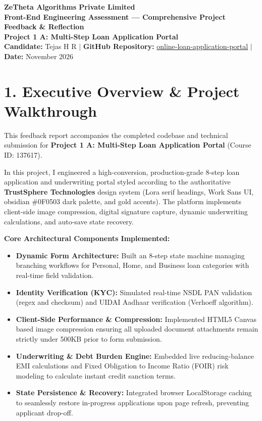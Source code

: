 \documentclass[11pt,a4paper]{article}
\begin{document}
\begin{center}
    {\LARGE \textbf{\color{primary}ZeTheta Algorithms Private Limited}}\\[4pt]
    {\large \textbf{Front-End Engineering Assessment — Comprehensive Project Feedback \& Reflection}}\\[2pt]
    \textbf{Project 1 A: Multi-Step Loan Application Portal}\\[3pt]
    \textbf{Candidate:} Tejas H R \quad $|$ \quad \textbf{GitHub Repository:} \href{https://github.com/tejashr0716/online-loan-application-portal}{online-loan-application-portal} \quad $|$ \quad \textbf{Date:} November 2026
\end{center}

\vspace{4pt}

\section{1. Executive Overview \& Project Walkthrough}
This feedback report accompanies the completed codebase and technical submission for \textbf{Project 1 A: Multi-Step Loan Application Portal} (Course ID: 137617).

In this project, I engineered a high-conversion, production-grade 8-step loan application and underwriting portal styled according to the authoritative \textbf{TrustSphere Technologies} design system (Lora serif headings, Work Sans UI, obsidian \#0F0503 dark palette, and gold accents). The platform implements client-side image compression, digital signature capture, dynamic underwriting calculations, and auto-save state recovery.

\textbf{Core Architectural Components Implemented:}
\begin{itemize}[leftmargin=1.5em, itemsep=2pt]
    \item \textbf{Dynamic Form Architecture:} Built an 8-step state machine managing branching workflows for Personal, Home, and Business loan categories with real-time field validation.
    \item \textbf{Identity Verification (KYC):} Simulated real-time NSDL PAN validation (regex and checksum) and UIDAI Aadhaar verification (Verhoeff algorithm).
    \item \textbf{Client-Side Performance \& Compression:} Implemented HTML5 Canvas based image compression ensuring all uploaded document attachments remain strictly under 500KB prior to form submission.
    \item \textbf{Underwriting \& Debt Burden Engine:} Embedded live reducing-balance EMI calculations and Fixed Obligation to Income Ratio (FOIR) risk modeling to calculate instant credit sanction terms.
    \item \textbf{State Persistence \& Recovery:} Integrated browser LocalStorage caching to seamlessly restore in-progress applications upon page refresh, preventing applicant drop-off.
\end{itemize}
\end{document}
